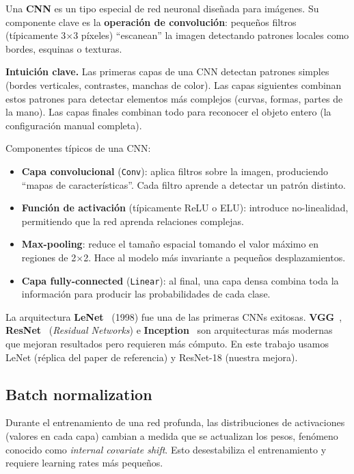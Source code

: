 \documentclass[a4paper,11pt]{article}
\begin{document}
Una \textbf{CNN} es un tipo especial de red neuronal diseñada para imágenes. Su componente clave es la \textbf{operación de convolución}: pequeños filtros (típicamente 3$\times$3 píxeles) ``escanean'' la imagen detectando patrones locales como bordes, esquinas o texturas.

\begin{concepto}
\textbf{Intuición clave.} Las primeras capas de una CNN detectan patrones simples (bordes verticales, contrastes, manchas de color). Las capas siguientes combinan estos patrones para detectar elementos más complejos (curvas, formas, partes de la mano). Las capas finales combinan todo para reconocer el objeto entero (la configuración manual completa).
\end{concepto}

Componentes típicos de una CNN:
\begin{itemize}[itemsep=2pt]
    \item \textbf{Capa convolucional} (\texttt{Conv}): aplica filtros sobre la imagen, produciendo ``mapas de características''. Cada filtro aprende a detectar un patrón distinto.
    \item \textbf{Función de activación} (típicamente ReLU o ELU): introduce no-linealidad, permitiendo que la red aprenda relaciones complejas.
    \item \textbf{Max-pooling}: reduce el tamaño espacial tomando el valor máximo en regiones de 2$\times$2. Hace al modelo más invariante a pequeños desplazamientos.
    \item \textbf{Capa fully-connected} (\texttt{Linear}): al final, una capa densa combina toda la información para producir las probabilidades de cada clase.
\end{itemize}

La arquitectura \textbf{LeNet}~\cite{lecun1998gradient} (1998) fue una de las primeras CNNs exitosas. \textbf{VGG}~\cite{simonyan2014very}, \textbf{ResNet}~\cite{he2016deep} (\textit{Residual Networks}) e \textbf{Inception}~\cite{szegedy2016rethinking} son arquitecturas más modernas que mejoran resultados pero requieren más cómputo. En este trabajo usamos LeNet (réplica del paper de referencia) y ResNet-18 (nuestra mejora).

\subsection{Batch normalization}

Durante el entrenamiento de una red profunda, las distribuciones de activaciones (valores en cada capa) cambian a medida que se actualizan los pesos, fenómeno conocido como \textit{internal covariate shift}. Esto desestabiliza el entrenamiento y requiere learning rates más pequeños.
\end{document}

